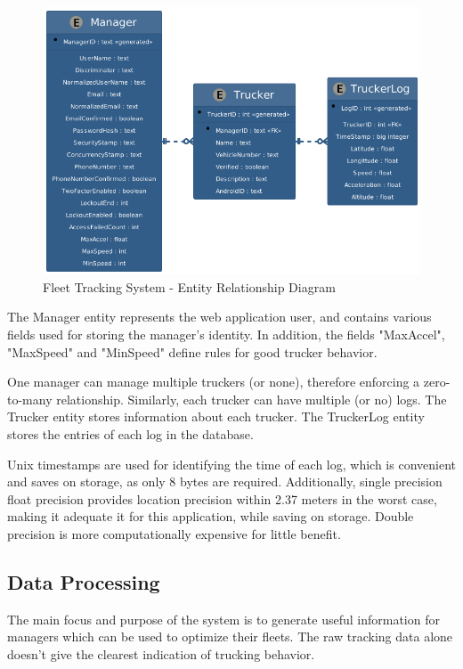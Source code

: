 \begin{figure}[H]
\centering
\includegraphics[scale=0.5]{../diag/erd.png}
\caption{Fleet Tracking System - Entity Relationship Diagram}
\label{fig:erd}
\end{figure}

The Manager entity represents the web application user, and contains various fields used for storing the manager's identity.
In addition, the fields "MaxAccel", "MaxSpeed" and "MinSpeed" define rules for good trucker behavior.

One manager can manage multiple truckers (or none), therefore enforcing a zero-to-many relationship.
Similarly, each trucker can have multiple (or no) logs.
The Trucker entity stores information about each trucker.
The TruckerLog entity stores the entries of each log in the database.

Unix timestamps are used for identifying the time of each log, which is convenient and saves on storage, as only 8 bytes are required.
Additionally, single precision float precision provides location precision within 2.37 meters\cite{noauthor_required_nodate} in the worst case, making it adequate it for this application, while saving on storage. Double precision is more computationally expensive for little benefit.

\pagebreak
\subsection{Data Processing}
The main focus and purpose of the system is to generate useful information for managers which can be used to optimize their fleets.
The raw tracking data alone doesn't give the clearest indication of trucking behavior.

